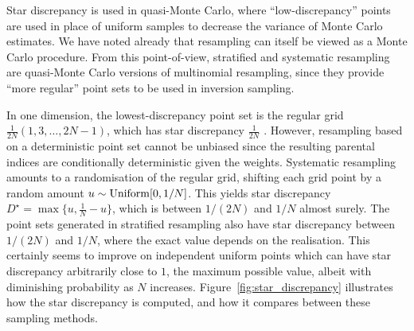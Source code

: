 Star discrepancy is used in quasi-Monte Carlo, where ``low-discrepancy'' points are used in place of uniform samples to decrease the variance of Monte Carlo estimates.
We have noted already that resampling can itself be viewed as a Monte Carlo procedure.
From this point-of-view, stratified and systematic resampling are quasi-Monte Carlo versions of multinomial resampling, since they provide ``more regular'' point sets to be used in inversion sampling.

In one dimension, the lowest-discrepancy point set is the regular grid $\frac{1}{2N}(1, 3, \dots, 2N-1)$, which has star discrepancy $\frac{1}{2N}$ \parencite[see for example][Corollary 1.2]{kuipers1974}.
However, resampling based on a deterministic point set cannot be unbiased since the resulting parental indices are conditionally deterministic given the weights.
Systematic resampling amounts to a randomisation of the regular grid, shifting each grid point by a random amount $u \sim \operatorname{Uniform}[0,1/N]$. This yields star discrepancy $D^\star = \max\{u, \frac{1}{N} -u\}$, which is between $1/(2N)$ and $1/N$ almost surely.
The point sets generated in stratified resampling also have star discrepancy between $1/(2N)$ and $1/N$, where the exact value depends on the realisation.
This certainly seems to improve on independent uniform points which can have star discrepancy arbitrarily close to $1$, the maximum possible value, albeit with diminishing probability as $N$ increases.
Figure~\ref{fig:star_discrepancy} illustrates how the star discrepancy is computed, and how it compares between these sampling methods.





